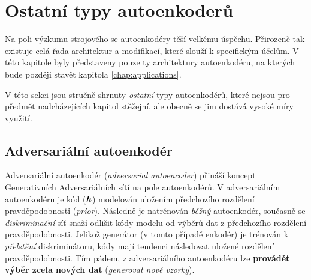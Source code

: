\section{Ostatní typy autoenkoderů}
Na poli výzkumu strojového se autoenkodéry těší velkému úspěchu. Přirozeně tak existuje celá řada architektur a modifikací, které slouží k specifickým účelům.
V této kapitole byly představeny pouze ty architektury autoenkodéru, na kterých bude později stavět kapitola \autoref{chap:applications}.

V této sekci jsou stručně shrnuty \emph{ostatní} typy autoenkodérů, které nejsou pro předmět nadcházejících kapitol stěžejní, ale obecně se jim dostává vysoké míry využití.

\subsection{Adversariální autoenkodér}
Adversariální autoenkodér (\emph{adversarial autoencoder}) přináší koncept Generativních Adversariálních sítí \cite{Goodfellow2014} na pole autoenkodérů.
V adversariálním autoenkodéru je kód ($\textbf{\emph{h}}$) modelován uložením předchozího rozdělení pravděpodobnosti (\emph{prior}).
Následně je natrénován \emph{běžný} autoenkodér, současně se \emph{diskriminační} síť snaží odlišit kódy modelu od výběrů dat z předchozího rozdělení pravděpodobnosti.
Jelikož generátor (v tomto případě enkodér) je trénován k \emph{přelstění} diskriminátoru, kódy mají tendenci následovat uložené rozdělení pravděpodobnosti.
Tím pádem, z adversariálního autoenkodéru lze \textbf{provádět výběr zcela nových dat} (\emph{generovat nové vzorky}). \cite{Charte2018}

